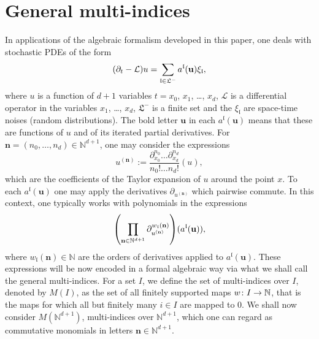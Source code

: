 \documentclass[AHL,Unicode,longabstracts]{cedram}
\newcommand{\bn}{\mathbf{n}}
\newcommand{\bu}{\mathbf{u}}
\newcommand{\mcL}{\mathcal{L}}
\newcommand{\mfl}{\mathfrak{l}}
\newcommand{\mfL}{\mathfrak{L}}
\newcommand{\bbN}{\mathbb{N}}
\renewcommand*{\to}{\mathchoice{\longrightarrow}{\rightarrow}{\rightarrow}{\rightarrow}}
\let\originalleft\left
\let\originalright\right
\renewcommand{\left}{\mathopen{}\mathclose\bgroup\originalleft}
\renewcommand{\right}{\aftergroup\egroup\originalright}
\begin{document}
\section{General multi-indices}\label{sec::2}

In applications of the algebraic formalism developed in this paper, one deals with stochastic PDEs of the form
\begin{equation}\label{set01}
\left(\partial_t - \mcL \right) u = \sum_{\mfl\in\mfL^-} a^\mfl (\bu) \xi_\mfl,
\end{equation}
where $u$ is a function of $d+1$ variables $t=x_0$, $x_1$, \dots, $x_d$, $\mcL$ is a differential operator in the variables $x_1$, \dots, $x_d$, $\mfL^- $ is a finite set and the $ \xi_{\mfl} $ are space-time noises (random distributions). The bold letter $\bu$ in each $a^\mfl(\bu)$ means that these are functions of $u$ and of its iterated partial derivatives. For $\bn=(n_0,\dots,n_d)\in\bbN^{d+1}$, one may consider the expressions
\[
u^{(\bn)}:=\frac{\partial_{x_0}^{n_0}\dots \partial_{x_d}^{n_d}}{n_0!\dots n_d!}(u),
\]
which are the coefficients of the Taylor expansion of $u$ around the point $x$. To each $a^\mfl (\bu)$ one may apply the derivatives $\partial_{u^{(\bn)}}$ which pairwise commute. In this context, one typically works with polynomials in the expressions
\[
\left(\prod_{\bn\in\bbN^{d+1}} \partial_{u^{(\bn)}}^{w_{\mfl}(\bn)}\right) (a^\mfl (\bu)),
\]
where $w_{\mfl}(\bn)\in\bbN$ are the orders of derivatives applied to $a^\mfl (\bu)$. These expressions will be now encoded in a formal algebraic way via what we shall call the general multi-indices. For a set $I$, we define the set of multi-indices over $I$, denoted by $M(I)$, as the set of all finitely supported maps $w\colon I\to\bbN$, that is the maps for which all but finitely many $i\in I$ are mapped to $0$. We shall now consider $M(\bbN^{d+1})$, multi-indices over $\bbN^{d+1}$, which one can regard as commutative monomials in letters $\bn\in\bbN^{d+1}$.
\end{document}
